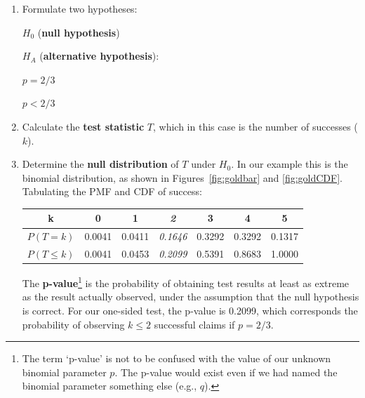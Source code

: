 \begin{enumerate}

\item Formulate two hypotheses:\medskip

\noindent\begin{minipage}{.4\textwidth}
  $H_0$ (\textbf{null hypothesis})
  
  \vspace{1em}
  
  $H_{\!A}$ (\textbf{alternative hypothesis}):
\end{minipage}
\begin{minipage}{.2\textwidth}
\end{minipage}
\begin{minipage}{.2\textwidth}
  $p={2/3}$
  
  \vspace{1em}
  
  $p<{2/3}$
\end{minipage}
\begin{minipage}{.2\textwidth}
\end{minipage}\medskip

\item Calculate the \textbf{test statistic} $T$, which in this case is
  the number of successes ($k$).

\item Determine the \textbf{null distribution} of $T$ under
  $H_0$. In our example this is the binomial distribution, as
  shown in Figures~\ref{fig:goldbar} and \ref{fig:goldCDF}. Tabulating
  the PMF and CDF of success:

  \begin{center}
  \begin{tabular}{ccccccc}
    k & 0 & 1 & \textit{2} & 3 & 4 & 5 \\ \hline
    $P(T=k)$ & 0.0041 & 0.0411 & \textit{0.1646} & 0.3292 & 0.3292 & 0.1317 \\
    $P({T}\leq{k})$ & 0.0041 & 0.0453 & \textit{0.2099} & 0.5391 & 0.8683 & 1.0000
  \end{tabular}
  \end{center}

The \textbf{p-value}\footnote{The term `p-value' is not to be confused
  with the value of our unknown binomial parameter $p$. The p-value
  would exist even if we had named the binomial parameter something
  else (e.g., $q$).} is the probability of obtaining test results at
least as extreme as the result actually observed, under the assumption
that the null hypothesis is correct. For our one-sided test, the
p-value is 0.2099, which corresponds the probability of observing
$k\leq{2}$ successful claims if $p=2/3$.
  

\end{enumerate}
